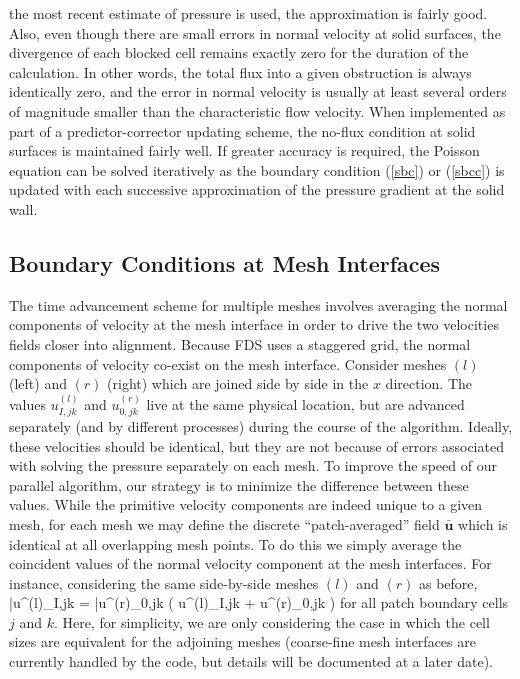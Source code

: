 the most recent estimate of pressure is used, the approximation is fairly
good. Also, even though there are small errors in normal velocity at solid
surfaces, the divergence of each blocked cell
remains exactly zero for the duration of the calculation.
In other words, the total flux into a given obstruction is always identically
zero, and the error in normal velocity is usually at least
several orders of magnitude smaller than the characteristic flow velocity.
When implemented as part of a predictor-corrector updating scheme,
the no-flux condition at solid surfaces is maintained fairly well. If greater accuracy is
required, the Poisson equation can be solved iteratively as the boundary condition (\ref{sbc}) or (\ref{sbcc}) is updated with
each successive approximation of the pressure gradient at the solid wall.



\subsection{Boundary Conditions at Mesh Interfaces}
\label{app_pressure_correction}

The time advancement scheme for multiple meshes involves averaging the normal components of velocity at the mesh interface in
order to drive the two velocities fields closer into alignment. Because FDS uses a staggered grid, the normal components of velocity co-exist on the mesh interface.
Consider meshes $(l)$ (left) and $(r)$ (right) which are joined side by side in the $x$ direction. The values $u^{(l)}_{I,jk}$
and $u^{(r)}_{0,jk}$ live at the same physical location, but are advanced separately (and by different processes)
during the course of the algorithm.
Ideally, these velocities should be identical, but they are not because of errors associated with solving the pressure separately on each mesh.
To improve the speed of our parallel algorithm, our strategy is to minimize the difference between these values.
While the primitive velocity components are indeed unique to a given mesh, for each mesh we may define the
discrete ``patch-averaged'' field $\bar{\mathbf{u}}$ which is identical at all overlapping mesh points.
To do this we simply average the coincident values of the normal velocity component at the mesh interfaces.
For instance, considering the same side-by-side meshes $(l)$ and $(r)$ as before,
\be
\label{eqn_patchave_ufield}
\bar{u}^{(l)}_{I,jk} = \bar{u}^{(r)}_{0,jk} \equiv {} \left( u^{(l)}_{I,jk} + u^{(r)}_{0,jk} \right)
\ee
for all patch boundary cells $j$ and $k$. Here, for simplicity, we are only considering the case in which the
cell sizes are equivalent for the adjoining meshes (coarse-fine mesh interfaces are currently handled by the code,
but details will be documented at a later date).

